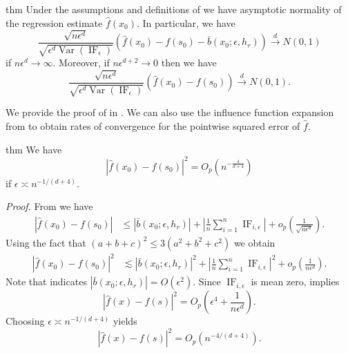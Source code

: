 \documentclass[11pt]{article}
\begin{document}
\begin{restatable}{thm}{} \label{corr: central limit for f}
    Under the assumptions and definitions of  we have asymptotic normality of the regression estimate $\hat f(x_0)$. In particular, we have 
    \[\frac{\sqrt{n\epsilon^d}}{\sqrt{\epsilon^d\operatorname{Var}(\operatorname{IF}_{\epsilon})}}\left(\hat{f}(x_0) - f(s_0) - \bar{b}(x_0; \epsilon, h_r)\right) \overset{d}\rightarrow N(0, 1)\]
    if $n\epsilon^d \rightarrow \infty$. Moreover, if $n\epsilon^{d+2} \rightarrow 0$ then we have
    \[\frac{\sqrt{n\epsilon^d}}{\sqrt{\epsilon^d\operatorname{Var}(\operatorname{IF}_{\epsilon})}}\left(\hat{f}(x_0) - f(s_0)\right) \overset{d}\rightarrow N(0, 1).\]
\end{restatable}
We provide the proof of  in . We can also use the influence function expansion from  to obtain rates of convergence for the pointwise squared error of $\hat f$. 


\begin{restatable}{thm}{}  \label{regression risk}
    We have
    \[\left|\hat{f}(x_0) - f(s_0)\right|^2 = O_p\left(n^{-\frac{4}{d+4}}\right) \]
    if $\epsilon \asymp n^{-1/(d+4)}$.
\end{restatable}
\noindent \textit{Proof.} From  we have
\begin{align}
    \left|\hat{f}(x_0) - f(s_0)\right| &\leq\left|\bar{b}(x_0; \epsilon, h_r)\right| + \left|\frac{1}{n}\sum_{i = 1}^n\operatorname{IF}_{i, \epsilon} \right| + o_p\left(\frac{1}{\sqrt{n\epsilon^d}}\right).
\end{align}
Using the fact that $(a+b+c)^2 \leq 3(a^2 + b^2 + c^2)$ we obtain
\begin{align}
    \left|\hat{f}(x_0) - f(s_0)\right|^2 &\lesssim \left|\bar{b}(x_0; \epsilon, h_r)\right|^2 + \left|\frac{1}{n}\sum_{i = 1}^n\operatorname{IF}_{i, \epsilon}\right|^2 + o_p\left(\frac{1}{n\epsilon^d}\right).
\end{align}
Note that  indicates $|\bar{b}(x_0; \epsilon, h_r)| = O(\epsilon^2)$. Since $\operatorname{IF}_{i, \epsilon}$ is mean zero,  implies
\[ \left|\hat{f}(x) - f(s)\right|^2 =  O_p\left(\epsilon^4 + \frac{1}{n\epsilon^d}\right).\]
Choosing $\epsilon \asymp n^{-1/(d+4)}$ yields
    \[\left|\hat{f}(x) - f(s)\right|^2 = O_p\left(n^{-4/(d+4)}\right). \]
\end{document}
